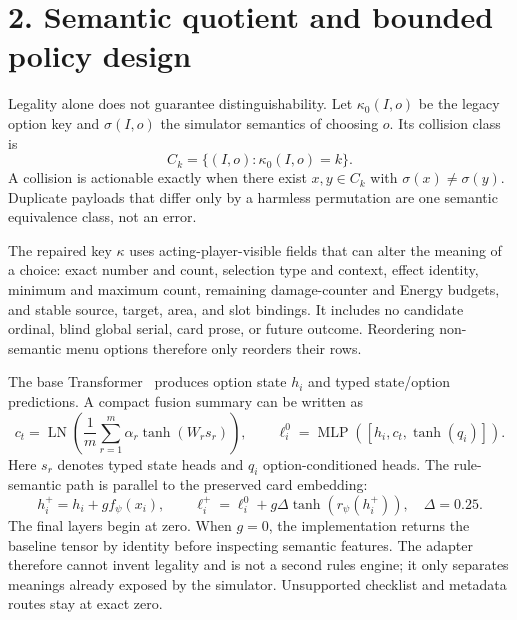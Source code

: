 \section*{2. Semantic quotient and bounded policy design}

Legality alone does not guarantee distinguishability. Let $\kappa_0(I,o)$ be
the legacy option key and $\sigma(I,o)$ the simulator semantics of choosing
$o$. Its collision class is
\[
 C_k=\{(I,o):\kappa_0(I,o)=k\}.
\]
A collision is actionable exactly when there exist $x,y\in C_k$ with
$\sigma(x)\neq\sigma(y)$. Duplicate payloads that differ only by a harmless
permutation are one semantic equivalence class, not an error.

The repaired key $\kappa$ uses acting-player-visible fields that can alter the
meaning of a choice: exact number and count, selection type and context,
effect identity, minimum and maximum count, remaining damage-counter and
Energy budgets, and stable source, target, area, and slot bindings. It includes
no candidate ordinal, blind global serial, card prose, or future outcome.
Reordering non-semantic menu options therefore only reorders their rows.

The base Transformer~\cite{vaswani2017attention} produces option state $h_i$
and typed state/option predictions. A compact fusion summary can be written as
\[
 c_t=\operatorname{LN}\!\left(
   \frac{1}{m}\sum_{r=1}^{m}\alpha_r\tanh(W_rs_r)\right),\qquad
 \ell_i^0=\operatorname{MLP}([h_i,c_t,\tanh(q_i)]) .
\]
Here $s_r$ denotes typed state heads and $q_i$ option-conditioned heads. The
rule-semantic path is parallel to the preserved card embedding:
\[
 h_i^+=h_i+g f_\psi(x_i),\qquad
 \ell_i^+=\ell_i^0+g\Delta\tanh(r_\psi(h_i^+)),\quad \Delta=0.25 .
\]
The final layers begin at zero. When $g=0$, the implementation returns the
baseline tensor by identity before inspecting semantic features. The adapter
therefore cannot invent legality and is not a second rules engine; it only
separates meanings already exposed by the simulator. Unsupported checklist
and metadata routes stay at exact zero.
